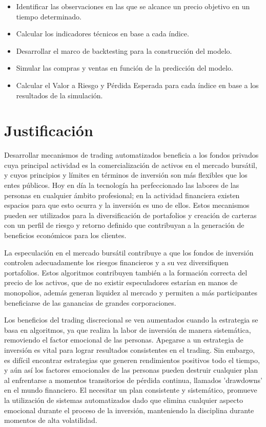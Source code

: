 \documentclass[a4paper,12pt]{Latex/Classes/PhDthesisPSnPDF}
\begin{document}
\begin{itemize}
\item Identificar las observaciones en las que se alcance un precio objetivo en un tiempo determinado.
\item Calcular los indicadores técnicos en base a cada índice.
\item Desarrollar el marco de backtesting para la construcción del modelo.
\item Simular las compras y ventas en función de la predicción del modelo.
\item Calcular el Valor a Riesgo y Pérdida Esperada para cada índice en base a los resultados de la simulación.
\end{itemize}

\section{Justificación}

Desarrollar mecanismos de trading automatizados beneficia a los fondos privados cuya principal actividad es la comercialización de activos en el mercado bursátil, y cuyos principios y límites en términos de inversión son más flexibles que los entes públicos. Hoy en día la tecnología ha perfeccionado las labores de las personas en cualquier ámbito profesional; en la actividad financiera existen espacios para que esto ocurra y la inversión es uno de ellos. Estos mecanismos pueden ser utilizados para la diversificación de portafolios y creación de carteras con un perfil de riesgo y retorno definido que contribuyan a la generación de beneficios económicos para los clientes.

La especulación en el mercado bursátil contribuye a que los fondos de inversión controlen adecuadamente los riesgos financieros y a su vez diversifiquen portafolios. Estos algoritmos contribuyen también a la formación correcta del precio de los activos, que de no existir especuladores estarían en manos de monopolios, además generan liquidez al mercado y permiten a más participantes beneficiarse de las ganancias de grandes corporaciones.

Los beneficios del trading discrecional se ven aumentados cuando la estrategia se basa en algoritmos, ya que realiza la labor de inversión de manera sistemática, removiendo el factor emocional de las personas. Apegarse a un estrategia de inversión es vital para lograr resultados consistentes en el trading. Sin embargo, es difícil encontrar estrategias que generen rendimientos positivos todo el tiempo, y aún así los factores emocionales de las personas pueden destruir cualquier plan al enfrentarse a momentos transitorios de pérdida continua, llamados 'drawdowns' en el mundo financiero. El necesitar un plan consistente y sistemático, promueve la utilización de sistemas automatizados dado que elimina cualquier aspecto emocional durante el proceso de la inversión, manteniendo la disciplina durante momentos de alta volatilidad.
\end{document}
